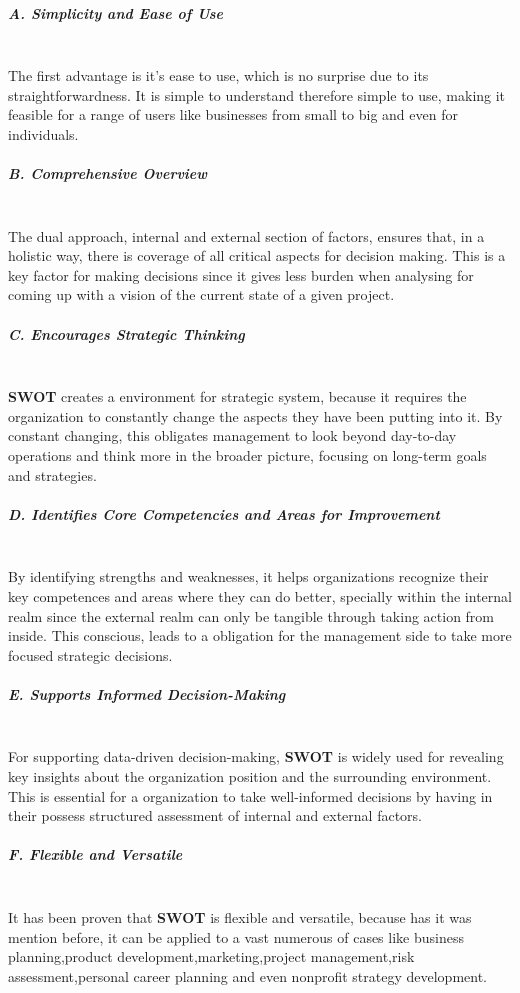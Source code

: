 \subparagraph{A. Simplicity and Ease of Use}\mbox{}\\
The first advantage is it's ease to use, which is no surprise due to its straightforwardness. It is simple to understand therefore simple to use, making it feasible for a range of users like businesses from small to big and even for individuals.

\subparagraph{B. Comprehensive Overview }\mbox{}\\
The dual approach, internal and external section of factors,  ensures that, in a holistic way, there is coverage of all critical aspects for decision making. This is a key factor for making decisions since it gives less burden when analysing for coming up with a vision of the current state of a given project.

\subparagraph{C. Encourages Strategic Thinking}\mbox{}\\
\textbf{SWOT} creates a environment for strategic system, because it requires the organization to constantly change the aspects they have been putting into it. By constant changing, this obligates management to look beyond day-to-day operations and think more in the broader picture, focusing on long-term goals and strategies.

\subparagraph{D. Identifies Core Competencies and Areas for Improvement}\mbox{}\\
By identifying strengths and weaknesses, it helps organizations recognize their key competences and areas where they can do better, specially within the internal realm since the external realm can only be tangible through taking action from inside. This conscious, leads to a obligation for the management side to take more focused strategic decisions.

\subparagraph{E. Supports Informed Decision-Making}\mbox{}\\
For supporting data-driven decision-making, \textbf{SWOT} is widely used for revealing key insights about the organization position and the surrounding environment. This is essential for a organization to take well-informed decisions by having in their possess structured assessment of internal and external factors.

\subparagraph{F. Flexible and Versatile}\mbox{}\\
It has been proven that \textbf{SWOT} is flexible and versatile, because has it was mention before, it can be applied to a vast numerous of cases like business planning,product development,marketing,project management,risk assessment,personal career planning and even nonprofit strategy development.

